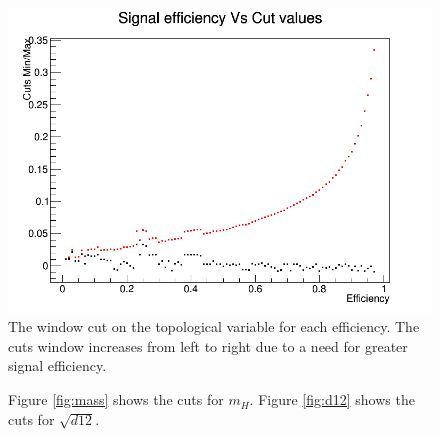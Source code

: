\begin{figure}[H]
\hspace{-1cm}
\includegraphics[scale=0.5]{figures/Cuts-VHptVptHpt.png}
\caption{The window cut on the topological variable for each efficiency. The cuts window increases from left to right due to a need for greater signal efficiency.}
\label{fig:cutsVH}
\end{figure}


\begin{figure}[H]
\hspace{-2.5cm}
\caption{ Figure \ref{fig:mass} shows the cuts for $m_{H}$. Figure \ref{fig:d12} shows the cuts for $\sqrt{d12}$.  }
\label{fig:cuts}
\end{figure}


